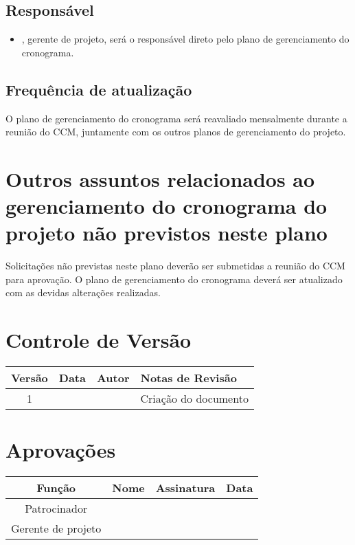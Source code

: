 \subsection{Responsável}

\begin{itemize}
	\item \projectManagerName, gerente de projeto, será o responsável direto pelo plano de gerenciamento do cronograma.
\end{itemize}

\subsection{Frequência de atualização}

O plano de gerenciamento do cronograma será reavaliado mensalmente durante a reunião do CCM, juntamente com os outros planos de gerenciamento do projeto.

\section{Outros assuntos relacionados ao gerenciamento do cronograma do projeto não previstos neste plano}

Solicitações não previstas neste plano deverão ser submetidas a reunião do CCM para aprovação. O plano de gerenciamento do cronograma deverá ser atualizado com as devidas alterações realizadas.

\section{Controle de Versão}

\begin{table}[H]
	\begin{tabularx}{\textwidth}{| c | c | X | X |}
		\hline
		\textbf{Versão} & \textbf{Data} & \textbf{Autor}      & \textbf{Notas de Revisão} \\
		\hline
		1                &               & \projectManagerName & Criação do documento     \\
		\hline
	\end{tabularx}
	\centering
\end{table}

\section{Aprovações}

\begin{table}[H]
	\begin{tabularx}{\textwidth}{| c | c | X | c |}
		\hline
		\textbf{Função}  & \textbf{Nome}       & \textbf{Assinatura}      & \textbf{Data} \\
		\hline
		Patrocinador       & \projectSponsorName & \projectSponsorSignature &               \\
		\hline
		Gerente de projeto & \projectManagerName & \projectManagerSignature &               \\
		\hline
	\end{tabularx}
	\centering
\end{table}
